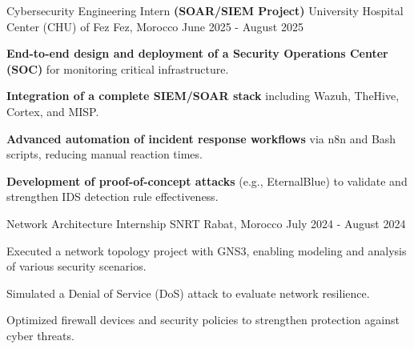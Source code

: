 
\begin{cventries}

    \cventry
    {Cybersecurity Engineering Intern \textbf{(SOAR/SIEM Project)}} %
    {University Hospital Center (CHU) of Fez} %
    {Fez, Morocco} %
    {June 2025 - August 2025} %
    {
        \begin{cvitems}
            \item {
                        \textbf{End-to-end design and deployment of a Security Operations Center (SOC)} for monitoring critical infrastructure.}
            \item {
                        \textbf{Integration of a complete SIEM/SOAR stack} including Wazuh, TheHive, Cortex, and MISP.}
            \item {
                        \textbf{Advanced automation of incident response workflows} via n8n and Bash scripts, reducing manual reaction times.}
            \item {
                        \textbf{Development of proof-of-concept attacks} (e.g., EternalBlue) to validate and strengthen IDS detection rule effectiveness.}
        \end{cvitems}
    }

    \cventry
    {Network Architecture Internship} %
    {SNRT} %
    {Rabat, Morocco} %
    {July 2024 - August 2024} %
    {
        \begin{cvitems} %
            \item {Executed a network topology project with GNS3, enabling modeling and analysis of various security scenarios.}
            \item {Simulated a Denial of Service (DoS) attack to evaluate network resilience.}
            \item {Optimized firewall devices and security policies to strengthen protection against cyber threats.}
        \end{cvitems}
    }
\end{cventries}
